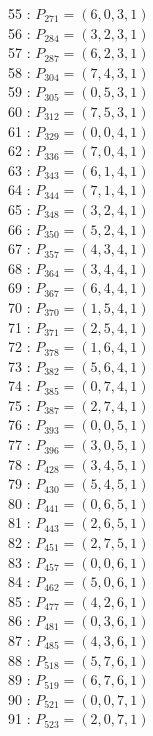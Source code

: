 \documentclass{article}
\begin{document}
{\begin{multicols}{3}
55 : $P_{271}=( 6, 0, 3, 1 )$\\
56 : $P_{284}=( 3, 2, 3, 1 )$\\
57 : $P_{287}=( 6, 2, 3, 1 )$\\
58 : $P_{304}=( 7, 4, 3, 1 )$\\
59 : $P_{305}=( 0, 5, 3, 1 )$\\
60 : $P_{312}=( 7, 5, 3, 1 )$\\
61 : $P_{329}=( 0, 0, 4, 1 )$\\
62 : $P_{336}=( 7, 0, 4, 1 )$\\
63 : $P_{343}=( 6, 1, 4, 1 )$\\
64 : $P_{344}=( 7, 1, 4, 1 )$\\
65 : $P_{348}=( 3, 2, 4, 1 )$\\
66 : $P_{350}=( 5, 2, 4, 1 )$\\
67 : $P_{357}=( 4, 3, 4, 1 )$\\
68 : $P_{364}=( 3, 4, 4, 1 )$\\
69 : $P_{367}=( 6, 4, 4, 1 )$\\
70 : $P_{370}=( 1, 5, 4, 1 )$\\
71 : $P_{371}=( 2, 5, 4, 1 )$\\
72 : $P_{378}=( 1, 6, 4, 1 )$\\
73 : $P_{382}=( 5, 6, 4, 1 )$\\
74 : $P_{385}=( 0, 7, 4, 1 )$\\
75 : $P_{387}=( 2, 7, 4, 1 )$\\
76 : $P_{393}=( 0, 0, 5, 1 )$\\
77 : $P_{396}=( 3, 0, 5, 1 )$\\
78 : $P_{428}=( 3, 4, 5, 1 )$\\
79 : $P_{430}=( 5, 4, 5, 1 )$\\
80 : $P_{441}=( 0, 6, 5, 1 )$\\
81 : $P_{443}=( 2, 6, 5, 1 )$\\
82 : $P_{451}=( 2, 7, 5, 1 )$\\
83 : $P_{457}=( 0, 0, 6, 1 )$\\
84 : $P_{462}=( 5, 0, 6, 1 )$\\
85 : $P_{477}=( 4, 2, 6, 1 )$\\
86 : $P_{481}=( 0, 3, 6, 1 )$\\
87 : $P_{485}=( 4, 3, 6, 1 )$\\
88 : $P_{518}=( 5, 7, 6, 1 )$\\
89 : $P_{519}=( 6, 7, 6, 1 )$\\
90 : $P_{521}=( 0, 0, 7, 1 )$\\
91 : $P_{523}=( 2, 0, 7, 1 )$\\

\end{multicols}}
\end{document}
